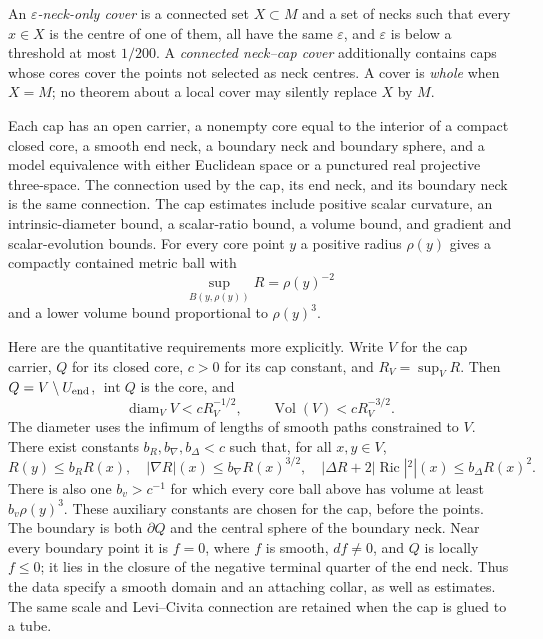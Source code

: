 An \emph{$\varepsilon$-neck-only cover} is a connected set $X\subset M$ and a
set of necks such that every $x\in X$ is the centre of one of them, all have
the same $\varepsilon$, and $\varepsilon$ is below a threshold at most
$1/200$.  A \emph{connected neck--cap cover} additionally contains caps whose
cores cover the points not selected as neck centres.  A cover is \emph{whole}
when $X=M$; no theorem about a local cover may silently replace $X$ by $M$.
\begin{definition}
\label{def:neck-cap-cap}
Each cap has an open carrier, a nonempty core equal to the interior of a
compact closed core, a smooth end neck, a boundary neck and boundary sphere,
and a model equivalence with either Euclidean space or a punctured real
projective three-space.  The connection used by the cap, its end neck, and its
boundary neck is the same connection.  The cap estimates include positive
scalar curvature, an intrinsic-diameter bound, a scalar-ratio bound, a volume
bound, and gradient and scalar-evolution bounds.  For every core point $y$ a
positive radius $\rho(y)$ gives a compactly contained metric ball with
\[
 \sup_{B(y,\rho(y))}R=\rho(y)^{-2}
\]
and a lower volume bound proportional to $\rho(y)^3$.

Here are the quantitative requirements more explicitly.  Write $V$ for the
cap carrier, $Q$ for its closed core, $c>0$ for its cap constant, and
$R_V=\sup_V R$.  Then $Q=V\setminus U_{\rm end}$,
$\operatorname{int}Q$ is the core, and
\[
 \operatorname{diam}_{V}V<cR_V^{-1/2},\qquad
 \operatorname{Vol}(V)<cR_V^{-3/2}.
\]
The diameter uses the infimum of lengths of smooth paths constrained to $V$.
There exist constants $b_R,b_\nabla,b_\Delta<c$ such that, for all $x,y\in V$,
\[
 R(y)\le b_RR(x),\quad |\nabla R|(x)\le b_\nabla R(x)^{3/2},\quad
 |\Delta R+2|\operatorname{Ric}|^2|(x)\le b_\Delta R(x)^2.
\]
There is also one $b_v>c^{-1}$ for which every core ball above has volume at
least $b_v\rho(y)^3$.  These auxiliary constants are chosen for the cap,
before the points.  The boundary is both $\partial Q$ and the central sphere
of the boundary neck.  Near every boundary point it is $f=0$, where $f$ is
smooth, $df\ne0$, and $Q$ is locally $f\le0$; it lies in the closure of the
negative terminal quarter of the end neck.  Thus the data specify a smooth
domain and an attaching collar, as well as estimates.  The same scale and
Levi--Civita connection are retained when the cap is glued to a tube.
\end{definition}

